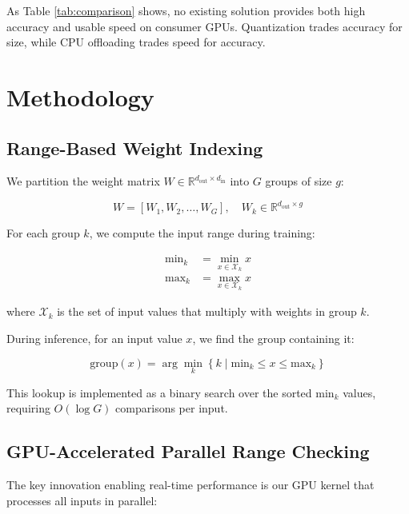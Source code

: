 \documentclass[twocolumn,10pt]{article}
\begin{document}
As Table \ref{tab:comparison} shows, no existing solution provides both high accuracy and usable speed on consumer GPUs. Quantization trades accuracy for size, while CPU offloading trades speed for accuracy.

\section{Methodology}

\subsection{Range-Based Weight Indexing}

We partition the weight matrix $W \in \mathbb{R}^{d_{\text{out}} \times d_{\text{in}}}$ into $G$ groups of size $g$:

\begin{equation}
W = [W_1, W_2, \ldots, W_G], \quad W_k \in \mathbb{R}^{d_{\text{out}} \times g}
\end{equation}

For each group $k$, we compute the input range during training:

\begin{align}
\text{min}_k &= \min_{x \in \mathcal{X}_k} x \\
\text{max}_k &= \max_{x \in \mathcal{X}_k} x
\end{align}

where $\mathcal{X}_k$ is the set of input values that multiply with weights in group $k$.

During inference, for an input value $x$, we find the group containing it:

\begin{equation}
\text{group}(x) = \arg\min_{k} \left\{ k \mid \text{min}_k \leq x \leq \text{max}_k \right\}
\end{equation}

This lookup is implemented as a binary search over the sorted $\text{min}_k$ values, requiring $O(\log G)$ comparisons per input.

\subsection{GPU-Accelerated Parallel Range Checking}

The key innovation enabling real-time performance is our GPU kernel that processes all inputs in parallel:
\end{document}
